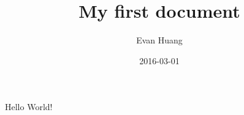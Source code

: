 \documentclass{article}
\title{My first document}
\date{2016-03-01}
\author{Evan Huang}
\begin{document}
  \maketitle
  \newpage


  Hello World!
\end{document}
